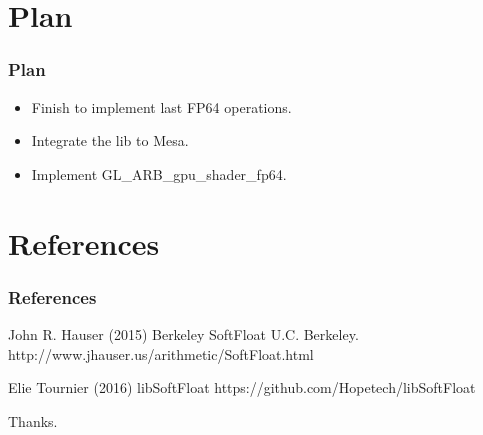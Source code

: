 \documentclass{beamer}
\begin{document}
\section{Plan}

\begin{frame}
\frametitle{Plan}
\begin{itemize}
\item Finish to implement last FP64 operations.
\item Integrate the lib to Mesa.
\item Implement GL\_ARB\_gpu\_shader\_fp64.
\end{itemize}
\end{frame}

\section{References}

\begin{frame}
\frametitle{References}
\footnotesize{
\begin{thebibliography}{99} %
 John R. Hauser (2015)
\newblock Berkeley SoftFloat
\newblock U.C. Berkeley.
\newblock http://www.jhauser.us/arithmetic/SoftFloat.html

 Elie Tournier (2016)
\newblock libSoftFloat
\newblock https://github.com/Hopetech/libSoftFloat

\end{thebibliography}
}
\end{frame}


\begin{frame}
\Huge{\centerline{Thanks.}}
\end{frame}

\end{document}
